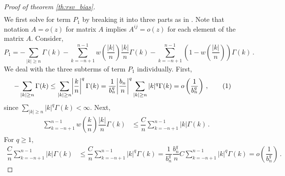 \documentclass[11pt]{article}
\newcommand\numberthis{\addtocounter{equation}{1}\tag{\theequation}}
\theoremstyle{remark}
\begin{document}
\begin{proof}[Proof of theorem \ref{th:rsv_bias}]
\begin{align*}
\end{align*}
%
We first solve for term $P_1$ by breaking it into three parts as in \cite{hannan2009multiple}. Note that notation $A = o(z)$ for matrix $A$  implies $A^{ij} = o(z)$ for each element of the matrix $A$. Consider,
\begin{equation}
\label{eq:P1_decomp}
P_1 = -\sum_{|k|\geq n}\Gamma(k)  -  \sum_{k = -n+1}^{n-1}w\left(\dfrac{|k|}{n}\right)\dfrac{|k|}{n}\Gamma(k)- \sum_{k = -n+1}^{n-1}\left(1-w\left(\dfrac{|k|}{n}\right)\right)\Gamma(k)\,.  
\end{equation}
%
We deal with the three subterms of term $P_1$ individually. First,
%    
\begin{align*}
 {-\sum_{|k|\geq n}\Gamma(k)} &\leq  \sum_{|k|\geq n} \abs{\dfrac{k}{n}}^q   \Gamma(k) = \dfrac{1}{b_n^q}\abs{\dfrac{b_n}{n}}^q \sum_{|k|\geq n}|k|^q  \Gamma(k) = o\left(\dfrac{1}{b_n^q}\right)\,, \numberthis \label{eq:P1_first}
\end{align*}
%
since $\sum_{|k|\geq n}|k|^q \Gamma(k)  < \infty$. Next,
%
\begin{align*}
 \sum_{k = -n+1}^{n-1}w\left(\dfrac{k}{n}\right)\dfrac{|k|}{n}\Gamma(k)   &\leq \dfrac{C}{n}\sum_{k = -n+1}^{n-1}|k|  \Gamma(k)  \,.
\end{align*}
For $q\geq 1$,
\begin{align*}
\dfrac{C}{n}\sum_{k = -n+1}^{n-1}|k|  \Gamma(k) &\leq \dfrac{C}{n}\sum_{k = -n+1}^{n-1}|k|^q  \Gamma(k) = \dfrac{1}{b_n^q}\dfrac{b_n^q}{n} C\sum_{k = -n+1}^{n-1}|k|^q  \Gamma(k)  = o\left(\dfrac{1}{b_n^q}\right)\,.
\end{align*}
          

\end{proof}
\end{document}
